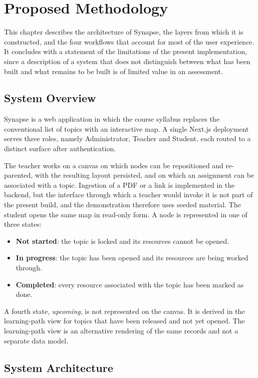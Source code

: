 \chapter{Proposed Methodology}

This chapter describes the architecture of Synapse, the layers from which it is constructed, and the four workflows that account for most of the user experience. It concludes with a statement of the limitations of the present implementation, since a description of a system that does not distinguish between what has been built and what remains to be built is of limited value in an assessment.

\section{System Overview}

Synapse is a web application in which the course syllabus replaces the conventional list of topics with an interactive map. A single Next.js deployment serves three roles, namely Administrator, Teacher and Student, each routed to a distinct surface after authentication.

The teacher works on a canvas on which nodes can be repositioned and re-parented, with the resulting layout persisted, and on which an assignment can be associated with a topic. Ingestion of a PDF or a link is implemented in the backend, but the interface through which a teacher would invoke it is not part of the present build, and the demonstration therefore uses seeded material. The student opens the same map in read-only form. A node is represented in one of three states:

\begin{itemize}
    \item \textbf{Not started}: the topic is locked and its resources cannot be opened.
    \item \textbf{In progress}: the topic has been opened and its resources are being worked through.
    \item \textbf{Completed}: every resource associated with the topic has been marked as done.
\end{itemize}

A fourth state, \emph{upcoming}, is not represented on the canvas. It is derived in the learning-path view for topics that have been released and not yet opened. The learning-path view is an alternative rendering of the same records and not a separate data model.

\section{System Architecture}

